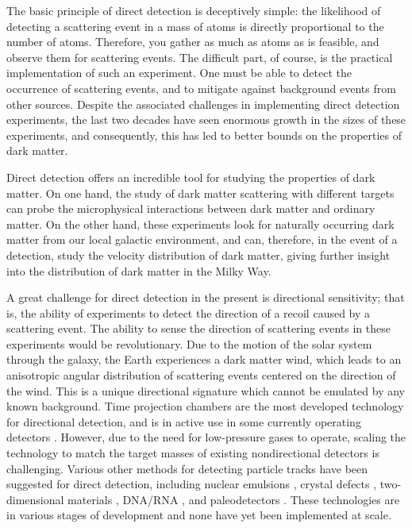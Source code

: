 The basic principle of direct detection is deceptively simple: the likelihood of detecting a scattering event in a mass of atoms is directly proportional to the number of atoms. Therefore, you gather as much as atoms as is feasible, and observe them for scattering events. The difficult part, of course, is the practical implementation of such an experiment. One must be able to detect the occurrence of scattering events, and to mitigate against background events from other sources. Despite the associated challenges in implementing direct detection experiments, the last two decades have seen enormous growth in the sizes of these experiments, and consequently, this has led to better bounds on the properties of dark matter.

Direct detection offers an incredible tool for studying the properties of dark matter. On one hand, the study of dark matter scattering with different targets can probe the microphysical interactions between dark matter and ordinary matter. On the other hand, these experiments look for naturally occurring dark matter from our local galactic environment, and can, therefore, in the event of a detection, study the velocity distribution of dark matter, giving further insight into the distribution of dark matter in the Milky Way.

A great challenge for direct detection in the present is directional sensitivity; that is, the ability of experiments to detect the direction of a recoil caused by a scattering event. The ability to sense the direction of scattering events in these experiments would be revolutionary. Due to the motion of the solar system through the galaxy, the Earth experiences a dark matter wind, which leads to an anisotropic angular distribution of scattering events centered on the direction of the wind. This is a unique directional signature which cannot be emulated by any known background. Time projection chambers are the most developed technology for directional detection, and is in active use in some currently operating detectors \parencites{BattatEtAl2017, IkedaEtAl2021}. However, due to the need for low-pressure gases to operate, scaling the technology to match the target masses of existing nondirectional detectors is challenging. Various other methods for detecting particle tracks have been suggested for direct detection, including nuclear emulsions \parencite{AgafonovaEtAl2018}, crystal defects \parencites{RajendranEtAl2017, MarshallEtAl2021}, two-dimensional materials \parencites{CapparelliEtAl2015, MarshallEtAl2021, BaracchiniEtAl2018}, DNA/RNA \parencites{DrukierEtAl2012, OHareEtAl2022}, and paleodetectors \parencite{BaumEtAl2020}. These technologies are in various stages of development and none have yet been implemented at scale.

